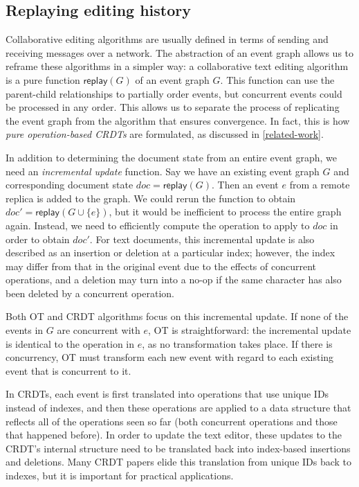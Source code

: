 \documentclass[sigplan,10pt]{acmart}
\begin{document}
\subsection{Replaying editing history}\label{replay}

Collaborative editing algorithms are usually defined in terms of sending and receiving messages over a network.
The abstraction of an event graph allows us to reframe these algorithms in a simpler way: a collaborative text editing algorithm is a pure function $\mathsf{replay}(G)$ of an event graph $G$.
This function can use the parent-child relationships to partially order events, but concurrent events could be processed in any order.
This allows us to separate the process of replicating the event graph from the algorithm that ensures convergence.
In fact, this is how \emph{pure operation-based CRDTs} \cite{polog} are formulated, as discussed in \autoref{related-work}.

In addition to determining the document state from an entire event graph, we need an \emph{incremental update} function.
Say we have an existing event graph $G$ and corresponding document state $\mathit{doc} = \mathsf{replay}(G)$. Then an event $e$ from a remote replica is added to the graph.
We could rerun the function to obtain $\mathit{doc}' = \mathsf{replay}(G \cup \{e\})$, but it would be inefficient to process the entire graph again.
Instead, we need to efficiently compute the operation to apply to $\mathit{doc}$ in order to obtain $\mathit{doc}'$.
For text documents, this incremental update is also described as an insertion or deletion at a particular index; however, the index may differ from that in the original event due to the effects of concurrent operations, and a deletion may turn into a no-op if the same character has also been deleted by a concurrent operation.

Both OT and CRDT algorithms focus on this incremental update.
If none of the events in $G$ are concurrent with $e$, OT is straightforward: the incremental update is identical to the operation in $e$, as no transformation takes place.
If there is concurrency, OT must transform each new event with regard to each existing event that is concurrent to it.

In CRDTs, each event is first translated into operations that use unique IDs instead of indexes, and then these operations are applied to a data structure that reflects all of the operations seen so far (both concurrent operations and those that happened before).
In order to update the text editor, these updates to the CRDT's internal structure need to be translated back into index-based insertions and deletions.
Many CRDT papers elide this translation from unique IDs back to indexes, but it is important for practical applications. %
\end{document}

